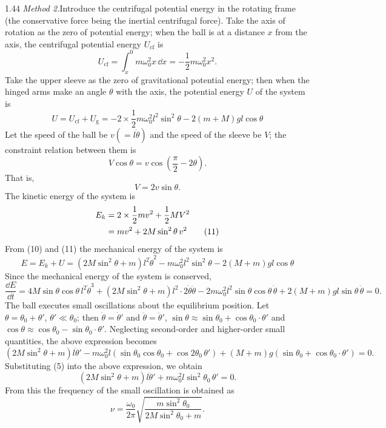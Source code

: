 \begin{solution}{1.44}
\textit{Method 2.}\quad Introduce the centrifugal potential energy in the rotating frame (the conservative force being the inertial centrifugal force). Take the axis of rotation as the zero of potential energy; when the ball is at a distance $x$ from the axis, the centrifugal potential energy $U_{\mathrm{cf}}$ is
\[
U_{\mathrm{cf}}=\int_x^0 m\omega_0^2x\,\dd x=-\frac{1}{2}m\omega_0^2x^2.
\]
Take the upper sleeve as the zero of gravitational potential energy; then when the hinged arms make an angle $\theta$ with the axis, the potential energy $U$ of the system is
\begin{equation}
U=U_{\mathrm{cf}}+U_{\mathrm{g}}=-2\times\frac{1}{2}m\omega_0^2l^2\sin^2\theta-2(m+M)gl\cos\theta \tag{10}
\end{equation}
Let the speed of the ball be $v(=l\dot\theta)$ and the speed of the sleeve be $V$; the constraint relation between them is
\[
V\cos\theta=v\cos\left(\frac{\pi}{2}-2\theta\right).
\]
That is,
\[
V=2v\sin\theta.
\]
The kinetic energy of the system is
\begin{align}
E_k&=2\times\frac{1}{2}mv^2+\frac{1}{2}MV^2\notag\\
&=mv^2+2M\sin^2\theta\,v^2 \tag{11}
\end{align}
From (10) and (11) the mechanical energy of the system is
\begin{equation}
E=E_k+U=(2M\sin^2\theta+m)l^2\dot\theta^2-m\omega_0^2l^2\sin^2\theta-2(M+m)gl\cos\theta \tag{12}
\end{equation}
Since the mechanical energy of the system is conserved,
\[
\frac{\dd E}{\dd t}=4M\sin\theta\cos\theta\,l^2\dot\theta^3+(2M\sin^2\theta+m)l^2\cdot2\dot\theta\ddot\theta-2m\omega_0^2l^2\sin\theta\cos\theta\,\dot\theta+2(M+m)gl\sin\theta\,\dot\theta=0.
\]
The ball executes small oscillations about the equilibrium position. Let $\theta=\theta_0+\theta'$, $\theta'\ll\theta_0$; then $\dot\theta=\dot\theta'$ and $\ddot\theta=\ddot\theta'$, $\sin\theta\approx\sin\theta_0+\cos\theta_0\cdot\theta'$ and $\cos\theta\approx\cos\theta_0-\sin\theta_0\cdot\theta'$. Neglecting second-order and higher-order small quantities, the above expression becomes
\[
(2M\sin^2\theta+m)l\ddot\theta'-m\omega_0^2l\left(\sin\theta_0\cos\theta_0+\cos2\theta_0\,\theta'\right)+(M+m)g\left(\sin\theta_0+\cos\theta_0\cdot\theta'\right)=0.
\]
Substituting (5) into the above expression, we obtain
\[
(2M\sin^2\theta+m)l\ddot\theta'+m\omega_0^2l\sin^2\theta_0\,\theta'=0.
\]
From this the frequency of the small oscillation is obtained as
\[
\nu=\frac{\omega_0}{2\pi}\sqrt{\frac{m\sin^2\theta_0}{2M\sin^2\theta_0+m}}.
\]


\end{solution}
